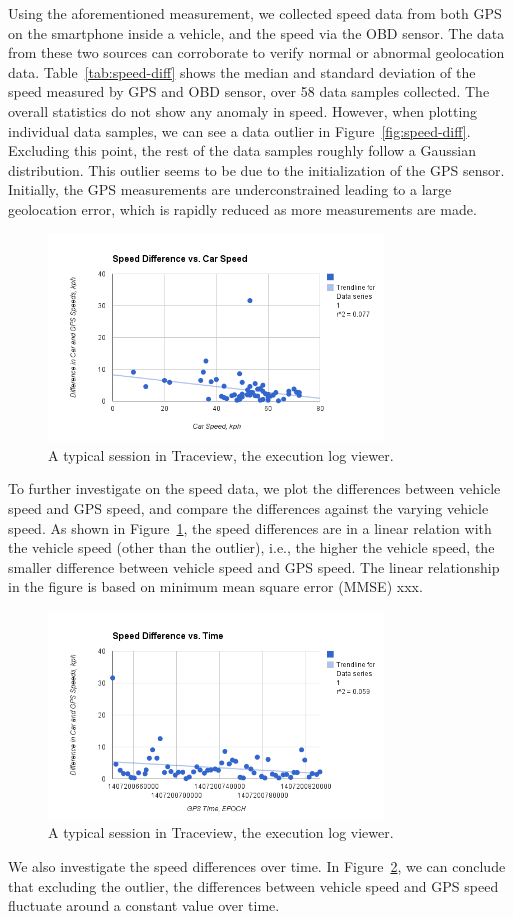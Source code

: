 Using the aforementioned measurement, we collected speed data from both GPS 
on the smartphone inside a vehicle, and the speed via the OBD sensor. 
The data from these two sources can corroborate to verify normal or abnormal 
geolocation data. Table~\ref{tab:speed-diff} shows the median and standard deviation
of the speed measured by GPS and OBD sensor, over 58 data samples collected. 
The overall statistics do not show any anomaly in speed. However, when plotting 
individual data samples, we can see a data outlier in Figure~\ref{fig:speed-diff}. 
Excluding this point, the rest of the data samples roughly follow a Gaussian 
distribution. This outlier seems to be due to the initialization of the
GPS sensor.  Initially, the GPS measurements are underconstrained leading to a large 
geolocation error, which is rapidly reduced as more measurements are made.


\begin{figure}
\centering
\includegraphics[width=3.5in]{car.png}
\caption{A typical session in Traceview, the execution log viewer.}
\label{fig:car}
\end{figure}

To further investigate on the speed data, we plot the differences between 
vehicle speed and GPS speed, and compare the differences against 
the varying vehicle speed. As shown in Figure~\ref{fig:car}, the speed 
differences are in a linear relation with the vehicle speed 
(other than the outlier), i.e., the 
higher the vehicle speed, the smaller difference between vehicle 
speed and GPS speed.  
The linear relationship in the figure is based on minimum mean 
square error (MMSE) xxx. 

\begin{figure}
\centering
\includegraphics[width=3.5in]{time.png}
\caption{A typical session in Traceview, the execution log viewer.}
\label{fig:time}
\end{figure}

We also investigate the speed differences over time. 
In Figure~\ref{fig:time}, we can conclude that excluding the outlier, 
the differences between 
vehicle speed and GPS speed fluctuate around a constant value over 
time. 

